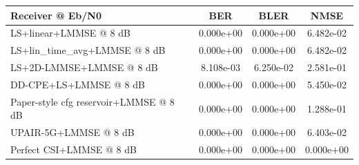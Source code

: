 \begin{tabular}{lccc}
\toprule
Receiver @ Eb/N0 & BER & BLER & NMSE \\
\midrule
LS+linear+LMMSE @ 8 dB & 0.000e+00 & 0.000e+00 & 6.482e-02 \\
LS+lin_time_avg+LMMSE @ 8 dB & 0.000e+00 & 0.000e+00 & 6.482e-02 \\
LS+2D-LMMSE+LMMSE @ 8 dB & 8.108e-03 & 6.250e-02 & 2.581e-01 \\
DD-CPE+LS+LMMSE @ 8 dB & 0.000e+00 & 0.000e+00 & 5.450e-02 \\
Paper-style cfg reservoir+LMMSE @ 8 dB & 0.000e+00 & 0.000e+00 & 1.288e-01 \\
UPAIR-5G+LMMSE @ 8 dB & 0.000e+00 & 0.000e+00 & 6.403e-02 \\
Perfect CSI+LMMSE @ 8 dB & 0.000e+00 & 0.000e+00 & 0.000e+00 \\
\bottomrule
\end{tabular}
